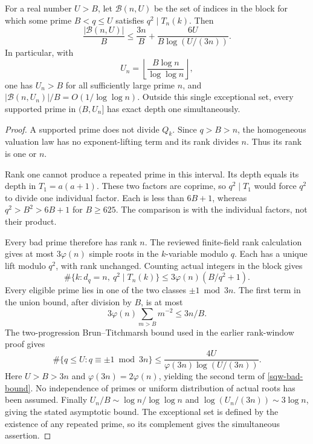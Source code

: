 \begin{theorem}\label{sqw-joint}
For a real number $U>B$, let $\mathcal B(n,U)$ be the set of indices
in the block for which some prime $B<q\le U$ satisfies $q^2\mid T_n(k)$.
Then
\begin{equation}\label{sqw-bad-bound}
 \frac{|\mathcal B(n,U)|}{B}
 \le \frac{3n}{B}+
       \frac{6U}{B\log(U/(3n))}.
\end{equation}
In particular, with
\[
 U_n=\left\lfloor\frac{B\log n}{\log\log n}\right\rfloor,
\]
one has $U_n>B$ for all sufficiently large prime $n$, and
$|\mathcal B(n,U_n)|/B=O(1/\log\log n)$.
Outside this single exceptional set, every supported prime in
$(B,U_n]$ has exact depth one simultaneously.
\end{theorem}
\begin{proof}
A supported prime does not divide $Q_k$. Since $q>B>n$, the
homogeneous valuation law has no exponent-lifting term and its rank
divides $n$. Thus its rank is one or $n$.

Rank one cannot produce a repeated prime in this interval. Its depth
equals its depth in $T_1=a(a+1)$. These two factors are coprime, so
$q^2\mid T_1$ would force $q^2$ to divide one individual factor.
Each is less than $6B+1$, whereas $q^2>B^2>6B+1$ for $B\ge625$.
The comparison is with the individual factors, not their product.

Every bad prime therefore has rank $n$. The reviewed finite-field
rank calculation gives at most $3\varphi(n)$ simple roots in the
$k$-variable modulo $q$. Each has a unique lift modulo $q^2$,
with rank unchanged. Counting actual integers in the block gives
\[
 \#\{k:d_q=n,\ q^2\mid T_n(k)\}
 \le3\varphi(n)(B/q^2+1).
\]
Every eligible prime lies in one of the two classes $\pm1\bmod 3n$.
The first term in the union bound, after division by $B$, is at most
\[
 3\varphi(n)\sum_{m>B}m^{-2}\le3n/B.
\]
The two-progression Brun--Titchmarsh bound used in the earlier
rank-window proof gives
\[
 \#\{q\le U:q\equiv\pm1\bmod 3n\}
 \le\frac{4U}{\varphi(3n)\log(U/(3n))}.
\]
Here $U>B>3n$ and $\varphi(3n)=2\varphi(n)$, yielding the second
term of \eqref{sqw-bad-bound}. No independence of primes or uniform
distribution of actual roots has been assumed. Finally
$U_n/B\sim\log n/\log\log n$ and
$\log(U_n/(3n))\sim3\log n$, giving the stated asymptotic bound.
The exceptional set is defined by the existence of any repeated
prime, so its complement gives the simultaneous assertion.
\end{proof}

